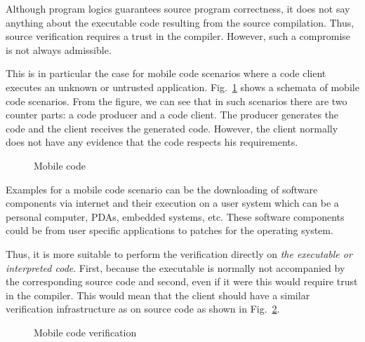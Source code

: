Although  program logics  guarantees source program correctness, it does not say anything about the executable code
resulting from the source compilation. Thus, source verification requires a  trust in the compiler.
However,  such a compromise is not always admissible. 



This is in particular  the case for mobile code scenarios  where a code client
executes an unknown or untrusted application. 
Fig.\ \ref{intro:mobile} shows a schemata of mobile code scenarios. From the figure, we can see that in such scenarios 
there are two counter parts:  a code producer and a code client. The producer generates the code and the client 
receives the generated code. However, the client  normally does not have any evidence that the code respects his requirements.
\begin{figure}[ht!]
\begin{center}
\caption{\sc Mobile code}
\label{intro:mobile}
\end{center}
\end{figure} 

Examples for a mobile code scenario can be the downloading of software components  via internet  and their execution  on a user system which can be a personal computer,
 PDAs, embedded systems, etc. These software components could be from user specific applications to patches for the operating system.

 


Thus, it is more suitable to perform the verification  directly on \textit{the executable or interpreted code}.
First, because the executable is normally not accompanied by the corresponding source code and second, even if it were this would require 
trust in the compiler.  This would mean that  the client should 
have a similar verification infrastructure as on source code as shown in Fig.\ \ref{intro:mobileVerif}.

\begin{figure}[ht!]
\begin{center}
\caption{\sc Mobile code verification}
\label{intro:mobileVerif}
\end{center}
\end{figure}

